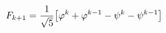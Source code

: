 \documentclass[preview]{standalone}
\begin{document}
\begin{align*}
\special{dvisvgm:raw <g id='unique000'>}F_{k+1} = \frac{1}{\sqrt{5}}\big[\varphi^k + \varphi^{k-1}- \psi^k - \psi^{k-1}\big]\special{dvisvgm:raw </g>}
\end{align*}
\end{document}
